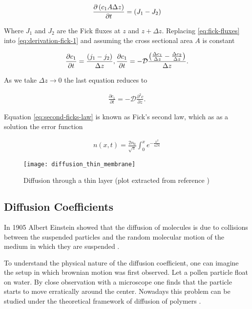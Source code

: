 \begin{align}
	\label{eq:derivation-fick-1}
	\frac{\partial \left({c_1 A\Delta z}\right)}{\partial t} = \left({J_1 - J_2}\right)
\end{align}

Where $J_1$ and $J_2$ are the Fick fluxes at $z$ and $z+\Delta z$. Replacing \ref{eq:fick-fluxes} into \ref{eq:derivation-fick-1} and assuming the cross sectional area $A$ is constant

\begin{align}
	\frac{\partial c_1}{\partial t} = \frac{\left({j_1 - j_2}\right)}{\Delta z},
	\frac{\partial c_1}{\partial t} = -\mathcal{D}\frac{\left({\frac{\Delta c_1}{\Delta z} - \frac{\Delta c_2}{\Delta z}}\right)}{\Delta z}.
\end{align}

As we take $\Delta z \rightarrow 0$ the last equation reduces to

\begin{align}
\label{eq:second-ficks-law}
	\frac{\partial c_1}{\partial t} = -\mathcal{D}\frac{\partial^2 c}{\partial z}.
\end{align}

Equation \ref{eq:second-ficks-law} is known as Fick's second law, which as as a solution the error function


\begin{align}
	\label{eq:solution-fick}
	n(x,t) = \frac{2n_0}{\sqrt{\pi}}\int_0^x e^{-\frac{x^2}{4\mathcal{D}t}}
\end{align}


\begin{figure}[h!]
\centering
	\texttt{[image: diffusion\_thin\_membrane]}
	\caption{Diffusion through a thin layer (plot extracted from reference \cite{cussler})}
\label{fig:cussler_thin_layer}
\end{figure}










\subsection{Diffusion Coefficients}

In 1905 Albert Einstein showed that the diffusion of molecules is due to collisions between the suspended particles and the random molecular motion of the medium in which they are suspended \cite{einstein}. 

To understand the physical nature of the diffusion coefficient, one can imagine the setup in which brownian motion was first observed. Let a pollen particle float on water. By close observation with a microscope one finds that the particle starts to move erratically around the center. Nowadays this problem can be studied under the theoretical framework of diffusion of polymers \cite{bird}.

